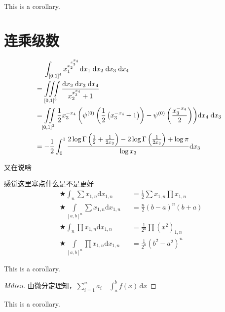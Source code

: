 \begin{corollary}[Milieu]
This is a corollary.
\end{corollary}

\section{连乘级数}
\begin{definition}[Milieu]
$$\begin{aligned}
  &\quad\;\int_{{{[0,1]}^4}} {x_1^{x_2^{x_3^{{x_4}}}}{\mkern 1mu} } {\text{d}}{x_1}\;{\text{d}}{x_2}\;{\text{d}}{x_3}\;{\text{d}}{x_4}\\
   &= \iiint\limits_{{{[0,1]}^3}} {\frac{{{\text{d}}{x_2}\;{\text{d}}{x_3}\;{\text{d}}{x_4}}}{{x_2^{x_3^{{x_4}}} + 1}}}\\
   &= \iint\limits_{{{[0,1]}^3}} {\frac{1}{2}x_3^{ - {x_4}}\left( {{\psi ^{(0)}}\left( {\frac{1}{2}\left( {x_3^{ - {x_4}} + 1} \right)} \right) - {\psi ^{(0)}}\left( {\frac{{x_3^{ - {x_4}}}}{2}} \right)} \right)}{\text{d}}{x_4}\;{\text{d}}{x_3}\\
   &=  - \frac{1}{2}\int_0^1 {\frac{{2\log \Gamma \left( {\frac{1}{2} + \frac{1}{{2{x_3}}}} \right) - 2\log \Gamma \left( {\frac{1}{{2{x_3}}}} \right) + \log \pi }}{{\log {x_3}}}} {\text{d}}{x_3}
\end{aligned} $$
\end{definition}

又在说啥
\begin{theorem}[Propagation]
感觉这里塞点什么是不是更好
$$\begin{aligned}
  &\bigstar\int_n {\sum {{x_{1,n}}} } {\text{d}}{x_{1,n}} &&= \frac{1}{2}\sum {{x_{1,n}}} \prod {{x_{1,n}}} \\
  &\bigstar\int\limits_{{{[a,b]}^n}} {\sum {{x_{1,n}}} } {\text{d}}{x_{1,n}} &&= \frac{n}{2}{(b - a)^n}(b + a)\\
  &\bigstar\int_n {\prod {{x_{1,n}}} } {\text{d}}{x_{1,n}} &&= \frac{1}{{{2^n}}}\prod {{{\left( {{x^2}} \right)}_{1,n}}} \\
  &\bigstar\int\limits_{{{[a,b]}^n}} {\prod {{x_{1,n}}} } {\text{d}}{x_{1,n}} &&= \frac{1}{{{2^n}}}{({b^2} - {a^2})^n}
\end{aligned}$$
\end{theorem}

\begin{lemma}[Milieu]
This is a corollary.
\end{lemma}


\begin{proof}[Milieu]
由微分定理知，$\sum_{i=1}^n a_i \quad \int_a^b f(x)\,\mathrm{d}x$
\end{proof}


\begin{corollary}[Milieu]
This is a corollary.
\end{corollary}